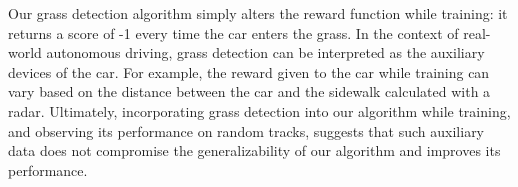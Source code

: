 Our grass detection algorithm simply alters the reward function while 
training: it returns a score of -1 every time the car enters the grass.
In the context of real-world autonomous driving, grass detection can be 
interpreted as the auxiliary devices of the car. For example, the reward
given to the car while training can vary based on the distance between
the car and the sidewalk calculated with a radar.
Ultimately, 
incorporating grass detection into our algorithm while training, and
observing its performance on random tracks, suggests that 
such auxiliary data does not compromise the generalizability of our 
algorithm and improves its performance. 


\endinput





